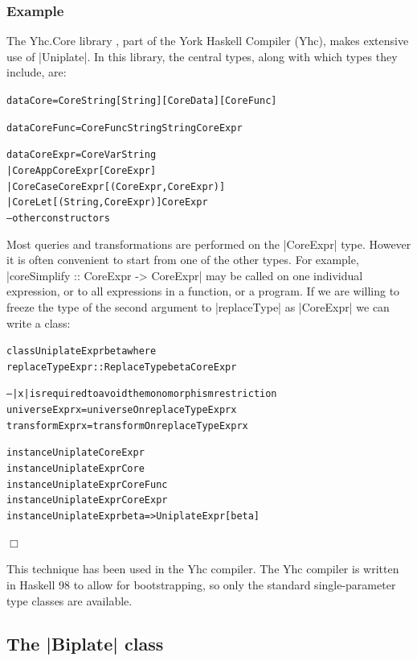 \documentclass[preprint]{sigplanconf}
\newcounter{exmp}
\newcommand{\yesexample}{\subsubsection*{Example \arabic{exmp}}\refstepcounter{exmp}}
\newcommand{\noexample}{\hfill$\Box$}
\newenvironment{code}{\begin{alltt}\small}{\end{alltt}}
\newenvironment{example}{\yesexample}{\noexample}
\begin{document}
\begin{example}
The Yhc.Core library \citep{me:yhc_core}, part of the York Haskell Compiler (Yhc), makes extensive use of |Uniplate|. In this library, the central types, along with which types they include, are:

\begin{code}
data Core      =  Core String [String] [CoreData] [CoreFunc]

data CoreFunc  =  CoreFunc String String CoreExpr

data CoreExpr  =  CoreVar   String
               |  CoreApp   CoreExpr  [CoreExpr]
               |  CoreCase  CoreExpr  [(CoreExpr, CoreExpr)]
               |  CoreLet   [(String, CoreExpr)] CoreExpr
                  -- other constructors
\end{code}

Most queries and transformations are performed on the |CoreExpr| type. However it is often convenient to start from one of the other types. For example, |coreSimplify :: CoreExpr -> CoreExpr| may be called on one individual expression, or to all expressions in a function, or a program. If we are willing to freeze the type of the second argument to |replaceType| as |CoreExpr| we can write a class:

\begin{code}
class  UniplateExpr beta where
       replaceTypeExpr :: ReplaceType beta CoreExpr

-- |x| is required to avoid the monomorphism restriction
universeExpr   x = universeOn   replaceTypeExpr x
transformExpr  x = transformOn  replaceTypeExpr x

instance Uniplate CoreExpr
instance UniplateExpr Core
instance UniplateExpr CoreFunc
instance UniplateExpr CoreExpr
instance UniplateExpr beta => UniplateExpr [beta]
\end{code}
\end{example}

This technique has been used in the Yhc compiler. The Yhc compiler is written in Haskell 98 to allow for bootstrapping, so only the standard single-parameter type classes are available.

\subsection{The |Biplate| class}
\end{document}
